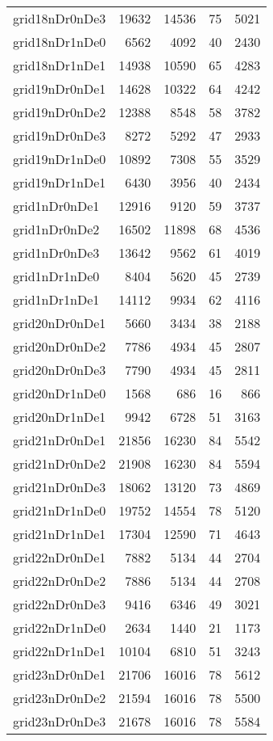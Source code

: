 \begin{longtable}{lrrrr}
grid18nDr0nDe3 & 19632 & 14536 & 75 & 5021 \\
grid18nDr1nDe0 & 6562 & 4092 & 40 & 2430 \\
grid18nDr1nDe1 & 14938 & 10590 & 65 & 4283 \\
grid19nDr0nDe1 & 14628 & 10322 & 64 & 4242 \\
grid19nDr0nDe2 & 12388 & 8548 & 58 & 3782 \\
grid19nDr0nDe3 & 8272 & 5292 & 47 & 2933 \\
grid19nDr1nDe0 & 10892 & 7308 & 55 & 3529 \\
grid19nDr1nDe1 & 6430 & 3956 & 40 & 2434 \\
grid1nDr0nDe1 & 12916 & 9120 & 59 & 3737 \\
grid1nDr0nDe2 & 16502 & 11898 & 68 & 4536 \\
grid1nDr0nDe3 & 13642 & 9562 & 61 & 4019 \\
grid1nDr1nDe0 & 8404 & 5620 & 45 & 2739 \\
grid1nDr1nDe1 & 14112 & 9934 & 62 & 4116 \\
grid20nDr0nDe1 & 5660 & 3434 & 38 & 2188 \\
grid20nDr0nDe2 & 7786 & 4934 & 45 & 2807 \\
grid20nDr0nDe3 & 7790 & 4934 & 45 & 2811 \\
grid20nDr1nDe0 & 1568 & 686 & 16 & 866 \\
grid20nDr1nDe1 & 9942 & 6728 & 51 & 3163 \\
grid21nDr0nDe1 & 21856 & 16230 & 84 & 5542 \\
grid21nDr0nDe2 & 21908 & 16230 & 84 & 5594 \\
grid21nDr0nDe3 & 18062 & 13120 & 73 & 4869 \\
grid21nDr1nDe0 & 19752 & 14554 & 78 & 5120 \\
grid21nDr1nDe1 & 17304 & 12590 & 71 & 4643 \\
grid22nDr0nDe1 & 7882 & 5134 & 44 & 2704 \\
grid22nDr0nDe2 & 7886 & 5134 & 44 & 2708 \\
grid22nDr0nDe3 & 9416 & 6346 & 49 & 3021 \\
grid22nDr1nDe0 & 2634 & 1440 & 21 & 1173 \\
grid22nDr1nDe1 & 10104 & 6810 & 51 & 3243 \\
grid23nDr0nDe1 & 21706 & 16016 & 78 & 5612 \\
grid23nDr0nDe2 & 21594 & 16016 & 78 & 5500 \\
grid23nDr0nDe3 & 21678 & 16016 & 78 & 5584 \\

\end{longtable}
